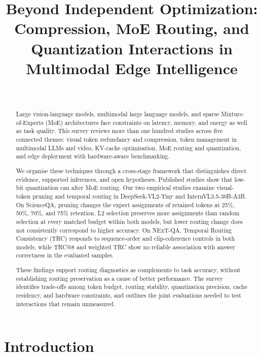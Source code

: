\documentclass[10pt]{article}
\title{Beyond Independent Optimization:
Compression, MoE Routing, and Quantization Interactions in Multimodal Edge Intelligence}
\author{\name [Authors Redacted for Peer Review] \email [redacted] \\
        \addr [Institution Redacted for Peer Review]}
\newenvironment{reviewchange}{\begingroup\color{red}}{\endgroup}
\begin{document}
\maketitle

\begin{abstract}
\begin{reviewchange}
Large vision-language models, multimodal large language models, and sparse
Mixture-of-Experts (MoE) architectures face constraints on latency, memory, and
energy as well as task quality. This survey reviews more than one hundred studies
across five connected themes: visual token redundancy and compression, token
management in multimodal LLMs and video, KV-cache optimisation, MoE routing and
quantization, and edge deployment with hardware-aware benchmarking.

We organise these techniques through a cross-stage framework that distinguishes
direct evidence, supported inferences, and open hypotheses. Published studies show
that low-bit quantization can alter MoE routing. Our two empirical studies examine
visual-token pruning and temporal routing in DeepSeek-VL2-Tiny and
InternVL3.5-30B-A3B. On ScienceQA, pruning changes the expert assignments of
retained tokens at 25\%, 50\%, 70\%, and 75\% retention. L2 selection preserves
more assignments than random selection at every matched budget within both models,
but lower routing change does not consistently correspond to higher accuracy.
On NExT-QA, Temporal Routing Consistency (TRC) responds to sequence-order and
clip-coherence controls in both models, while TRC@8 and weighted TRC show no reliable
association with answer correctness in the evaluated samples.

These findings support routing diagnostics as complements to task accuracy,
without establishing routing preservation as a cause of better performance.
The survey identifies trade-offs among token budget, routing stability,
quantization precision, cache residency, and hardware constraints, and outlines
the joint evaluations needed to test interactions that remain unmeasured.

\end{reviewchange}
\end{abstract}

\newpage

\section{Introduction}
\label{sec:intro}
\end{document}
